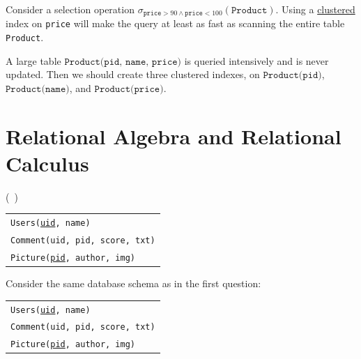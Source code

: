 \documentclass[addpoints,answers,12pt]{exam}
\begin{document}
\begin{questions}
\begin{parts}
\begin{subparts}
  \subpart Consider a selection operation $\sigma_{\texttt{price}>90
    \wedge \texttt{price} < 100}(\texttt{Product})$.  Using a
  \underline{clustered} index on \texttt{price} will make the query at
  least as fast as scanning the entire table \texttt{Product}.

  \subpart A large table $\texttt{Product(pid, name, price)}$ is
  queried intensively and is never updated.  Then we should create
  three clustered indexes, on $\texttt{Product(pid)}$,
  $\texttt{Product(name)}$, and $\texttt{Product(price)}$.

\end{subparts}

\newpage

\end{parts}

\section{Relational Algebra and Relational Calculus}

\question (\totalpoints\ \points) 

{\scriptsize
\hfill
\begin{tabular}{l}
  \texttt{Users(\underline{uid}, name)} \\
  \texttt{Comment(uid, pid, score, txt)} \\
  \texttt{Picture(\underline{pid}, author, img)}
\end{tabular}
}

Consider the same database schema as in the first question:


\begin{tabular}{l}
  \texttt{Users(\underline{uid}, name)} \\
  \texttt{Comment(uid, pid, score, txt)} \\
  \texttt{Picture(\underline{pid}, author, img)}
\end{tabular}


\end{questions}
\end{document}
